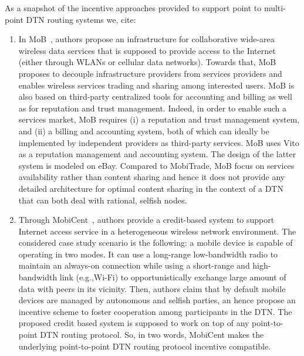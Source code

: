 As a snapshot of the incentive approaches provided to support point to multi-point DTN routing systems we, cite:
\begin{enumerate}

\item In MoB~\cite{MoB}, authors propose an infrastructure for collaborative wide-area wireless data services that is supposed to provide access to the Internet (either through WLANs or cellular data networks). Towards that,  MoB proposes to decouple infrastructure providers from services providers and enables wireless services trading and sharing among interested users. MoB is also based on third-party centralized tools for accounting and billing as well as for reputation and trust management. Indeed, in order to enable such a services market, MoB requires (i) a reputation and trust management system, and (ii) a billing and accounting system, both of which can ideally be implemented by independent providers as third-party services. MoB uses Vito as a reputation management and accounting system. The design of the latter system is modeled on eBay. Compared to MobiTrade, MoB focus on services availability rather than content sharing and hence it does not provide any detailed architecture for optimal content sharing in the context of a DTN that can both deal with rational, selfish nodes.

\item Through MobiCent~\cite{MobiCent}, authors provide a credit-based system to support Internet access service in a heterogeneous wireless network environment. The considered case study scenario is the following: a mobile device is capable of operating in two modes. It can use a long-range low-bandwidth radio to maintain an always-on connection while using a short-range and high-bandwidth link (e.g.,Wi-Fi) to opportunistically exchange large amount of data with peers in its vicinity. Then, authors
claim that by default mobile devices are managed by autonomous and selfish parties, an hence propose an incentive scheme to foster cooperation among participants in the DTN. The proposed credit based system is supposed to work on top of any point-to-point DTN routing protocol. So, in two words, MobiCent makes the underlying point-to-point DTN routing protocol incentive compatible. 


\end{enumerate}
